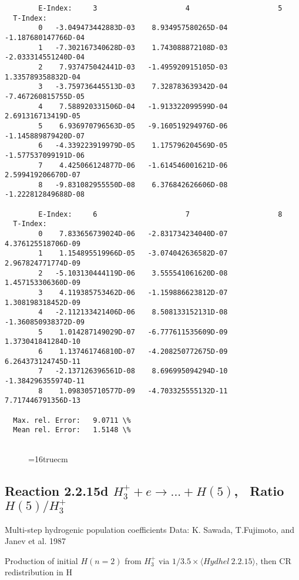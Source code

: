 \documentclass[12pt,dvipdfmx]{article}
\begin{document}
{\begin{small}
\begin{verbatim}
        E-Index:     3                     4                     5
  T-Index:
        0   -3.049473442883D-03    8.934957580265D-04   -1.187680147766D-04
        1   -7.302167340628D-03    1.743088872108D-03   -2.033314551240D-04
        2    7.937475042441D-03   -1.495920915105D-03    1.335789358832D-04
        3   -3.759736445513D-03    7.328783639342D-04   -7.467260815755D-05
        4    7.588920331506D-04   -1.913322099599D-04    2.691316713419D-05
        5    6.936970796563D-05   -9.160519294976D-06   -1.145889879420D-07
        6   -4.339223919979D-05    1.175796204569D-05   -1.577537099191D-06
        7    4.425066124877D-06   -1.614546001621D-06    2.599419206670D-07
        8   -9.831082955550D-08    6.376842626606D-08   -1.222812849688D-08

        E-Index:     6                     7                     8
  T-Index:
        0    7.833656739024D-06   -2.831734234040D-07    4.376125518706D-09
        1    1.154895519966D-05   -3.074042636582D-07    2.967824771774D-09
        2   -5.103130444119D-06    3.555541061620D-08    1.457153306360D-09
        3    4.119385753462D-06   -1.159886623812D-07    1.308198318452D-09
        4   -2.112133421406D-06    8.508133152131D-08   -1.360850938372D-09
        5    1.014287149029D-07   -6.777611535609D-09    1.373041841284D-10
        6    1.137461746810D-07   -4.208250772675D-09    6.264373124745D-11
        7   -2.137126396561D-08    8.696995094294D-10   -1.384296355974D-11
        8    1.098305710577D-09   -4.703325555132D-11    7.717446791356D-13

  Max. rel. Error:   9.0711 \%
  Mean rel. Error:   1.5148 \%


\end{verbatim}\end{small}
\begin{figure} \label{2.2.15c}
\epsfxsize=16truecm
\end{figure}
\newpage

\subsection{
Reaction 2.2.15d $ H_3^+ + e \rightarrow ...+ H(5) $, \   Ratio $H(5)/H_3^+  $
}

 Multi-step hydrogenic population coefficients
 Data: K. Sawada, T.Fujimoto, \cite{kn:Sawada} and Janev et al. 1987

 Production of initial $H(n=2)$ from $H_3^+$ via $1/3.5 \times \langle Hydhel~ 2.2.15\rangle$,
 then CR redistribution in H

}
\end{document}
